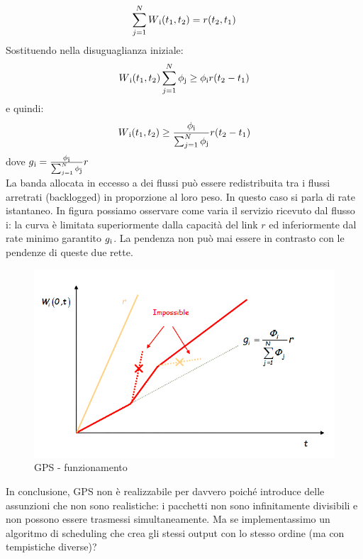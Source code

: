 \documentclass{article}
\begin{document}
\[ \sum_{j=1}^{N} W\textsubscript{i}(t\textsubscript{1}, t\textsubscript{2}) = r(t\textsubscript{2}, t\textsubscript{1}) \]
Sostituendo nella disuguaglianza iniziale:
\[ W\textsubscript{i}(t\textsubscript{1}, t\textsubscript{2})\sum_{j=1}^{N} \phi\textsubscript{j} \geq
\phi\textsubscript{i} r(t\textsubscript{2} - t\textsubscript{1}) \]
e quindi:
\[ W\textsubscript{i}(t\textsubscript{1}, t\textsubscript{2}) \geq \frac{\phi\textsubscript{i}}{\sum_{j=1}^{N} \phi\textsubscript{j}}r(t\textsubscript{2} - t\textsubscript{1})\]
dove \( g\textsubscript{i} = \frac{\phi\textsubscript{i}}{\sum_{j=1}^{N} \phi\textsubscript{j}}r \)\\
La banda allocata in eccesso a dei flussi può essere redistribuita tra i flussi arretrati (backlogged) in proporzione al loro peso. In questo caso si parla di rate istantaneo. In figura possiamo osservare come varia il servizio ricevuto dal flusso i: la curva è limitata superiormente dalla capacità del link \( r\) ed inferiormente dal rate minimo garantito \( g\textsubscript{i} \). La pendenza non può mai essere in contrasto con le pendenze di queste due rette.
\begin{figure}[H]
    \centering
    \includegraphics[scale=0.5]{figures/gps_rate.jpg}
    \caption{GPS - funzionamento}
\end{figure}
In conclusione, GPS non è realizzabile per davvero poiché introduce delle assunzioni che non sono realistiche:  i pacchetti non sono infinitamente divisibili e non possono essere trasmessi simultaneamente. Ma se implementassimo un algoritmo di scheduling che crea gli stessi output con lo stesso ordine (ma con tempistiche diverse)?
\end{document}

